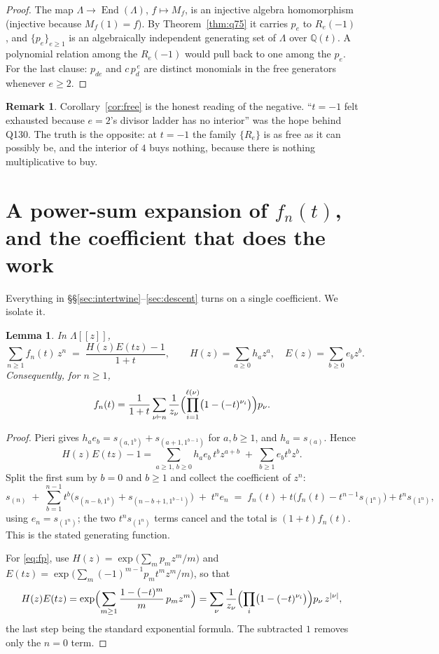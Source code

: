 \documentclass[11pt]{article}
\newtheorem{lemma}[theorem]{Lemma}
\theoremstyle{definition}
\newtheorem{remark}[theorem]{Remark}
\newcommand{\Q}{\mathbb{Q}}
\newcommand{\Lam}{\Lambda}
\newcommand{\Mult}[1]{M_{#1}}
\begin{document}
\begin{proof}
The map $\Lam\to\operatorname{End}(\Lam)$, $f\mapsto \Mult{f}$, is an injective algebra
homomorphism (injective because $\Mult{f}(1)=f$).  By Theorem~\ref{thm:q75} it carries $p_e$
to $R_e(-1)$, and $\{p_e\}_{e\ge1}$ is an algebraically independent generating set of
$\Lam$ over $\Q(t)$.  A polynomial relation among the $R_e(-1)$ would pull back to one among
the $p_e$.  For the last clause: $p_{de}$ and $c\,p_d^{\,e}$ are distinct monomials in the
free generators whenever $e\ge2$.
\end{proof}

\begin{remark}
Corollary~\ref{cor:free} is the honest reading of the negative.  ``$t=-1$ felt exhausted
because $e=2$'s divisor ladder has no interior'' was the hope behind Q130.  The truth is the
opposite: at $t=-1$ the family $\{R_e\}$ is as free as it can possibly be, and the interior
of $4$ buys nothing, because there is nothing multiplicative to buy.
\end{remark}

\section{A power-sum expansion of $f_n(t)$, and the coefficient that does the work}
\label{sec:gf}

Everything in \S\S\ref{sec:intertwine}--\ref{sec:descent} turns on a single coefficient.  We
isolate it.

\begin{lemma}\label{lem:gf}
In $\Lam[[z]]$,
\[
  \sum_{n\ge1}f_n(t)\,z^{n}\;=\;\frac{H(z)E(tz)-1}{1+t},
  \qquad H(z)=\sum_{a\ge0}h_az^{a},\quad E(z)=\sum_{b\ge0}e_bz^{b}.
\]
Consequently, for $n\ge1$,
\begin{equation}\label{eq:fp}
  f_n(t)=\frac{1}{1+t}\sum_{\nu\vdash n}\frac{1}{z_\nu}
  \Bigl(\prod_{i=1}^{\ell(\nu)}\bigl(1-(-t)^{\nu_i}\bigr)\Bigr)p_\nu .
\end{equation}
\end{lemma}

\begin{proof}
Pieri gives $h_ae_b=s_{(a,1^{b})}+s_{(a+1,1^{b-1})}$ for $a,b\ge1$, and $h_a=s_{(a)}$.
Hence
\[
  H(z)E(tz)-1=\sum_{a\ge1,\,b\ge0}h_ae_b\,t^{b}z^{a+b}\;+\;\sum_{b\ge1}e_b t^{b}z^{b}.
\]
Split the first sum by $b=0$ and $b\ge1$ and collect the coefficient of $z^n$:
\[
  s_{(n)}\;+\;\sum_{b=1}^{n-1}t^{b}\bigl(s_{(n-b,1^{b})}+s_{(n-b+1,1^{b-1})}\bigr)\;+\;t^{n}e_n
  \;=\;f_n(t)+t\bigl(f_n(t)-t^{n-1}s_{(1^{n})}\bigr)+t^{n}s_{(1^n)},
\]
using $e_n=s_{(1^n)}$; the two $t^{n}s_{(1^n)}$ terms cancel and the total is $(1+t)f_n(t)$.
This is the stated generating function.

For \eqref{eq:fp}, use $H(z)=\exp\bigl(\sum_m p_mz^m/m\bigr)$ and
$E(tz)=\exp\bigl(\sum_m(-1)^{m-1}p_mt^{m}z^{m}/m\bigr)$, so that
\[
  H(z)E(tz)=\exp\Bigl(\sum_{m\ge1}\frac{1-(-t)^{m}}{m}\,p_mz^{m}\Bigr)
  =\sum_{\nu}\frac{1}{z_\nu}\Bigl(\prod_i\bigl(1-(-t)^{\nu_i}\bigr)\Bigr)p_\nu\,z^{|\nu|},
\]
the last step being the standard exponential formula.  The subtracted $1$ removes only the
$n=0$ term.
\end{proof}
\end{document}
